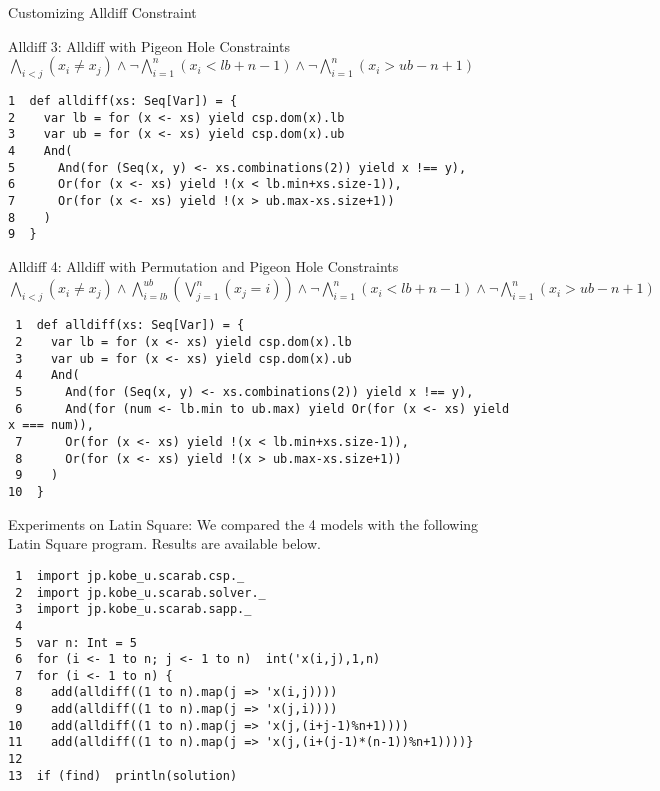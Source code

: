 \documentclass[compress,dvipdfmx]{beamer}
\begin{document}
\begin{frame}[fragile,label=sec-2]{Customizing Alldiff Constraint}
\begin{block}{\alert{Alldiff 3}: Alldiff with Pigeon Hole Constraints}
$\bigwedge_{i<j} (x_{i} \ne x_{j}) \wedge \neg\bigwedge_{i=1}^{n}(x_{i} < lb + n - 1) \wedge \neg\bigwedge_{i=1}^{n}(x_{i} > ub - n+ 1)$
\begin{verbatim}
1  def alldiff(xs: Seq[Var]) = {
2    var lb = for (x <- xs) yield csp.dom(x).lb 
3    var ub = for (x <- xs) yield csp.dom(x).ub 
4    And(
5      And(for (Seq(x, y) <- xs.combinations(2)) yield x !== y),
6      Or(for (x <- xs) yield !(x < lb.min+xs.size-1)),
7      Or(for (x <- xs) yield !(x > ub.max-xs.size+1))
8    )
9  }
\end{verbatim}
\end{block}
\begin{block}{\alert{Alldiff 4}: Alldiff with Permutation and Pigeon Hole Constraints}
$\bigwedge_{i<j} (x_{i} \ne x_{j}) \wedge \bigwedge_{i=lb}^{ub}\left(\bigvee_{j=1}^{n} (x_{j}=i)\right) \wedge \neg\bigwedge_{i=1}^{n}(x_{i} < lb + n - 1) \wedge \neg\bigwedge_{i=1}^{n}(x_{i} > ub - n+ 1)$
\begin{verbatim}
 1  def alldiff(xs: Seq[Var]) = {
 2    var lb = for (x <- xs) yield csp.dom(x).lb 
 3    var ub = for (x <- xs) yield csp.dom(x).ub 
 4    And(
 5      And(for (Seq(x, y) <- xs.combinations(2)) yield x !== y),
 6      And(for (num <- lb.min to ub.max) yield Or(for (x <- xs) yield x === num)),
 7      Or(for (x <- xs) yield !(x < lb.min+xs.size-1)),
 8      Or(for (x <- xs) yield !(x > ub.max-xs.size+1))
 9    )
10  }
\end{verbatim}
\end{block}
\begin{block}{\alert{Experiments on Latin Square}: We compared the 4 models with the following Latin Square program. Results are available below.}
\begin{verbatim}
 1  import jp.kobe_u.scarab.csp._
 2  import jp.kobe_u.scarab.solver._
 3  import jp.kobe_u.scarab.sapp._
 4  
 5  var n: Int = 5
 6  for (i <- 1 to n; j <- 1 to n)  int('x(i,j),1,n) 
 7  for (i <- 1 to n) {
 8    add(alldiff((1 to n).map(j => 'x(i,j))))
 9    add(alldiff((1 to n).map(j => 'x(j,i))))
10    add(alldiff((1 to n).map(j => 'x(j,(i+j-1)%n+1))))
11    add(alldiff((1 to n).map(j => 'x(j,(i+(j-1)*(n-1))%n+1))))}
12  
13  if (find)  println(solution)
\end{verbatim}
\end{block}
\end{frame}
\end{document}
